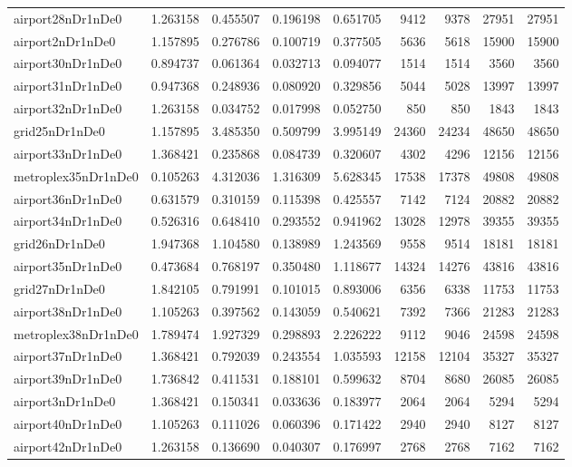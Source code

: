 \begin{longtable}{|l|r|r|r|r|r|r|r|r|}
airport28nDr1nDe0 & 1.263158 & 0.455507 & 0.196198 & 0.651705 & 9412 & 9378 & 27951 & 27951 \\
airport2nDr1nDe0 & 1.157895 & 0.276786 & 0.100719 & 0.377505 & 5636 & 5618 & 15900 & 15900 \\
airport30nDr1nDe0 & 0.894737 & 0.061364 & 0.032713 & 0.094077 & 1514 & 1514 & 3560 & 3560 \\
airport31nDr1nDe0 & 0.947368 & 0.248936 & 0.080920 & 0.329856 & 5044 & 5028 & 13997 & 13997 \\
airport32nDr1nDe0 & 1.263158 & 0.034752 & 0.017998 & 0.052750 & 850 & 850 & 1843 & 1843 \\
grid25nDr1nDe0 & 1.157895 & 3.485350 & 0.509799 & 3.995149 & 24360 & 24234 & 48650 & 48650 \\
airport33nDr1nDe0 & 1.368421 & 0.235868 & 0.084739 & 0.320607 & 4302 & 4296 & 12156 & 12156 \\
metroplex35nDr1nDe0 & 0.105263 & 4.312036 & 1.316309 & 5.628345 & 17538 & 17378 & 49808 & 49808 \\
airport36nDr1nDe0 & 0.631579 & 0.310159 & 0.115398 & 0.425557 & 7142 & 7124 & 20882 & 20882 \\
airport34nDr1nDe0 & 0.526316 & 0.648410 & 0.293552 & 0.941962 & 13028 & 12978 & 39355 & 39355 \\
grid26nDr1nDe0 & 1.947368 & 1.104580 & 0.138989 & 1.243569 & 9558 & 9514 & 18181 & 18181 \\
airport35nDr1nDe0 & 0.473684 & 0.768197 & 0.350480 & 1.118677 & 14324 & 14276 & 43816 & 43816 \\
grid27nDr1nDe0 & 1.842105 & 0.791991 & 0.101015 & 0.893006 & 6356 & 6338 & 11753 & 11753 \\
airport38nDr1nDe0 & 1.105263 & 0.397562 & 0.143059 & 0.540621 & 7392 & 7366 & 21283 & 21283 \\
metroplex38nDr1nDe0 & 1.789474 & 1.927329 & 0.298893 & 2.226222 & 9112 & 9046 & 24598 & 24598 \\
airport37nDr1nDe0 & 1.368421 & 0.792039 & 0.243554 & 1.035593 & 12158 & 12104 & 35327 & 35327 \\
airport39nDr1nDe0 & 1.736842 & 0.411531 & 0.188101 & 0.599632 & 8704 & 8680 & 26085 & 26085 \\
airport3nDr1nDe0 & 1.368421 & 0.150341 & 0.033636 & 0.183977 & 2064 & 2064 & 5294 & 5294 \\
airport40nDr1nDe0 & 1.105263 & 0.111026 & 0.060396 & 0.171422 & 2940 & 2940 & 8127 & 8127 \\
airport42nDr1nDe0 & 1.263158 & 0.136690 & 0.040307 & 0.176997 & 2768 & 2768 & 7162 & 7162 \\

\end{longtable}
